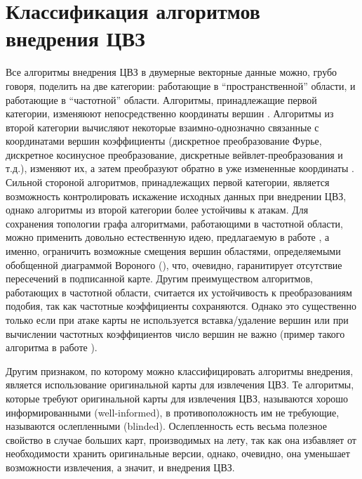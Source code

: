 \section{Классификация алгоритмов внедрения ЦВЗ}
\label{sec:classification}
Все алгоритмы внедрения ЦВЗ в двумерные векторные данные можно, грубо говоря, поделить на две категории: 
работающие в ``пространственной'' области, и работающие в ``частотной'' области. 
Алгоритмы, принадлежащие первой категории, изменяюют непосредственно 
координаты вершин \cite{Kim, Chang, Bazin}. Алгоритмы из второй категории вычисляют некоторые 
взаимно-однозначно связанные с координатами вершин коэффициенты (дискретное преобразование Фурье, 
дискретное косинусное преобразование, дискретные вейвлет-преобразования и т.д.), изменяют их, а затем 
преобразуют обратно в уже измененные координаты \cite{Voight, Ohbuchi, Ohbuchi3D, Praun}.  
Сильной стороной алгоритмов, принадлежащих первой категории, является возможность контролировать искажение
исходных данных при внедрении ЦВЗ, однако алгоритмы из второй категории более устойчивы к атакам.
Для сохранения топологии графа алгоритмами, работающими в частотной области, можно применить довольно естественную идею,
предлагаемую в работе \cite{Huber}, а именно, ограничить 
возможные смещения вершин областями, определяемыми обобщенной диаграммой Вороного (\cite{Held}), что, очевидно,
гаранитирует отсутствие пересечений в подписанной карте. 
Другим преимуществом алгоритмов, работающих в частотной области, считается их устойчивость к преобразованиям
подобия, так как частотные коэффициенты сохраняются.
Однако это существенно только если при атаке карты не используется вставка/удаление вершин или 
при вычислении частотных коэффициентов число вершин не важно (пример такого алгоритма в работе \cite{Shao}). 

Другим признаком, по которому можно классифицировать алгоритмы внедрения, является использование 
оригинальной карты для извлечения ЦВЗ. Те алгоритмы, которые требуют оригинальной карты для извлечения ЦВЗ,
называются хорошо информированными (well-informed), в противоположность им не требующие, называются ослепленными
(blinded). Ослепленность есть весьма полезное свойство в случае больших карт, производимых на лету, 
так как она избавляет от необходимости хранить оригинальные версии, однако, очевидно, она уменьшает возможности
извлечения, а значит, и внедрения ЦВЗ.
